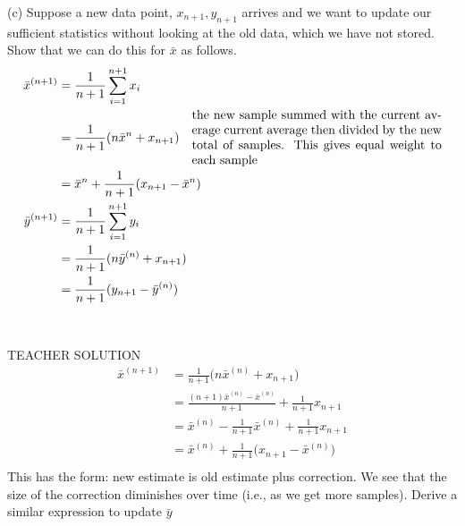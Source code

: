 \documentclass[draft]{exam} %
\theoremstyle{definition} \newtheorem*{defn}{Definition}
\begin{document}
\begin{questions}
\begin{solution}
(c) Suppose a new data point, $x_{n+1}, y_{n+1}$ arrives and we want to update our sufficient statistics without looking at the old data, which we have not stored.  Show that we can do this for $\bar{x}$ as follows.\\
\begin{align*}
\bar{x}^{(n+1)} & = \frac{1}{n+1} \sum_{i=1}^{n+1} x_i \\
& = \frac{1}{n+1} (n \bar{x}^{n} + x_{n+1}) \quad \parbox{20em}{the new sample summed with the current average current average then divided by the new total of samples.  This gives equal weight to each sample} \\
& = \bar{x}^{n} + \frac{1}{n+1} (x_{n+1} - \bar{x}^{n}) \\
\bar{y}^{(n+1)} & = \frac{1}{n+1} \sum_{i=1}^{n+1} y_i \\
& = \frac{1}{n+1} (n \bar{y}^{(n)} + x_{n+1}) \\
& = \frac{1}{n+1} (y_{n+1} - \bar{y}^{(n)})
\end{align*}
\\\\
TEACHER SOLUTION
\begin{align*}
\bar{x}^{(n+1)} & =  \frac{1}{n+1} \big(n \bar{x}^{(n)} + x_{n+1}\big)\\
& =  \frac{(n+1)\bar{x}^{(n)} -\bar{x}^{(n)}}{n+1} + \frac{1}{n+1}x_{n+1}\\
& = \bar{x}^{(n)} - \frac{1}{n+1}\bar{x}^{(n)} + \frac{1}{n+1}x_{n+1}\\
& = \bar{x}^{(n)} + \frac{1}{n+1}\big( x_{n+1} - \bar{x}^{(n)} \big)\\
\end{align*}
This has the form: new estimate is old estimate plus correction.  We see that the size of the correction diminishes over time (i.e., as we get more samples).  Derive a similar expression to update $\bar{y}$\\


\end{solution}
\end{questions}
\end{document}
